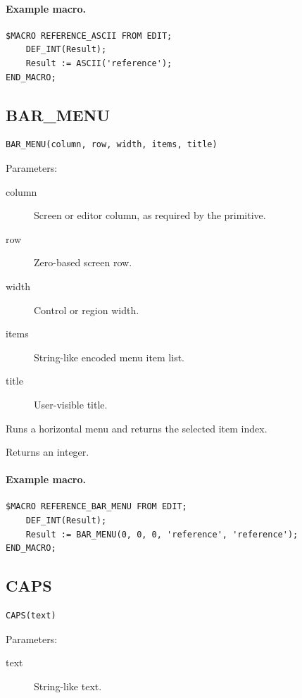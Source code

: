 \documentclass[a4paper,10pt,twoside,openany]{book}
\begin{document}
\paragraph{Example macro.}
\begin{verbatim}
$MACRO REFERENCE_ASCII FROM EDIT;
    DEF_INT(Result);
    Result := ASCII('reference');
END_MACRO;
\end{verbatim}

\label{prim:intrinsic-bar-menu}
\subsection*{BAR\_MENU}
\begin{verbatim}
BAR_MENU(column, row, width, items, title)
\end{verbatim}
Parameters:
\begin{description}
\item[column] Screen or editor column, as required by the primitive.
\item[row] Zero-based screen row.
\item[width] Control or region width.
\item[items] String-like encoded menu item list.
\item[title] User-visible title.
\end{description}

Runs a horizontal menu and returns the selected item index.

Returns an integer.

\paragraph{Example macro.}
\begin{verbatim}
$MACRO REFERENCE_BAR_MENU FROM EDIT;
    DEF_INT(Result);
    Result := BAR_MENU(0, 0, 0, 'reference', 'reference');
END_MACRO;
\end{verbatim}

\label{prim:intrinsic-caps}
\subsection*{CAPS}
\begin{verbatim}
CAPS(text)
\end{verbatim}
Parameters:
\begin{description}
\item[text] String-like text.
\end{description}
\end{document}

